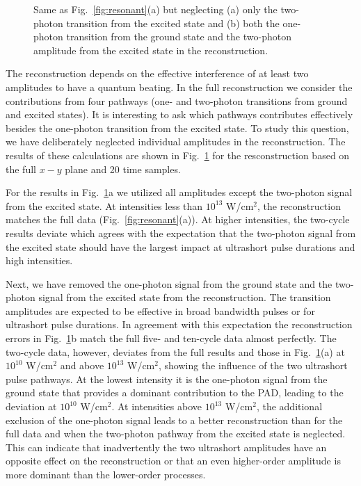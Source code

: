 \begin{figure}[t]
\centering
\caption{Same as Fig.\ \ref{fig:resonant}(a) but neglecting (a) only the two-photon transition from the excited state and (b) both the one-photon transition from the ground state and the two-photon amplitude from the excited state in the reconstruction. 
} 
  \label{fig:pathways_reconstruct}
\end{figure}

The reconstruction depends on the effective interference of at least two amplitudes to have a quantum beating. In the full reconstruction we consider the contributions from four pathways (one- and two-photon transitions from ground and excited states). It is interesting to ask which pathways contributes effectively besides the one-photon transition from the excited state. To study this question, we have deliberately neglected individual amplitudes in the reconstruction. The results of these calculations are shown in Fig.\ \ref{fig:pathways_reconstruct} for the resconstruction based on the full $x-y$ plane and 20 time samples.

For the results in Fig.~\ref{fig:pathways_reconstruct}a we utilized all amplitudes except the two-photon signal from the excited state. At intensities less than $10^{13}$ W/cm$^2$, the reconstruction matches the full data (Fig.~\ref{fig:resonant}(a)). At higher intensities, the two-cycle results deviate which agrees with the expectation that the two-photon signal from the excited state should have the largest impact at ultrashort pulse durations and high intensities. 

Next, we have removed the one-photon signal from the ground state and the two-photon signal from the excited state from the reconstruction. The transition amplitudes are expected to be effective in broad bandwidth pulses or for ultrashort pulse durations. In agreement with this expectation the reconstruction errors in Fig.~\ref{fig:pathways_reconstruct}b match the full five- and ten-cycle data almost perfectly. The two-cycle data, however, deviates from the full results and those in Fig.~\ref{fig:pathways_reconstruct}(a) at $10^{10}$ W/cm$^2$ and above $10^{13}$ W/cm$^2$, showing the influence of the two ultrashort pulse pathways. At the lowest intensity it is the one-photon signal from the ground state that provides a dominant contribution to the PAD, leading to the deviation at $10^{10}$ W/cm$^2$. At intensities above $10^{13}$ W/cm$^2$, the additional exclusion of the one-photon signal leads to a better reconstruction than for the full data and when the two-photon pathway from the excited state is neglected. This can indicate that inadvertently the two ultrashort amplitudes have an opposite effect on the reconstruction or that an even higher-order amplitude is more dominant than the lower-order processes.

